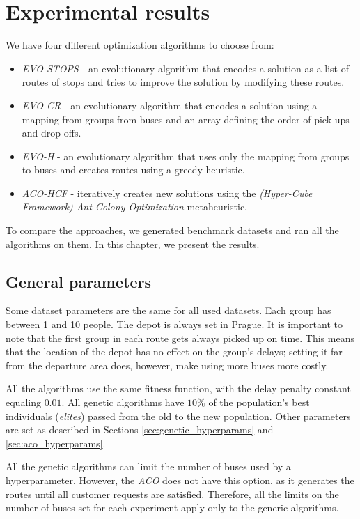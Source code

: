 \chapter{Experimental results}\label{ch:experiments}

We have four different optimization algorithms to choose from:
\begin{itemize}
    \item \textit{EVO-STOPS} - an evolutionary algorithm that encodes a solution as a list of routes of stops and tries to improve the solution by modifying these routes.
    \item \textit{EVO-CR} - an evolutionary algorithm that encodes a solution using a mapping from groups from buses and an array defining the order of pick-ups and drop-offs.
    \item \textit{EVO-H} - an evolutionary algorithm that uses only the mapping from groups to buses and creates routes using a greedy heuristic.
    \item \textit{ACO-HCF} - iteratively creates new solutions using the \textit{(Hyper-Cube Framework) Ant Colony Optimization} metaheuristic.
\end{itemize}

To compare the approaches, we generated benchmark datasets and ran all the algorithms on them. In this chapter, we present the results.

\section{General parameters}

Some dataset parameters are the same for all used datasets. Each group has between 1 and 10 people. The depot is always set in Prague. It is important to note that the first group in each route gets always picked up on time. This means that the location of the depot has no effect on the group's delays; setting it far from the departure area does, however, make using more buses more costly.

All the algorithms use the same fitness function, with the delay penalty constant equaling $0.01$. All genetic algorithms have $10\%$ of the population's best individuals (\textit{elites}) passed from the old to the new population. Other parameters are set as described in Sections \ref{sec:genetic_hyperparams} and \ref{sec:aco_hyperparams}.

All the genetic algorithms can limit the number of buses used by a hyperparameter. However, the \textit{ACO} does not have this option, as it generates the routes until all customer requests are satisfied. Therefore, all the limits on the number of buses set for each experiment apply only to the generic algorithms.

